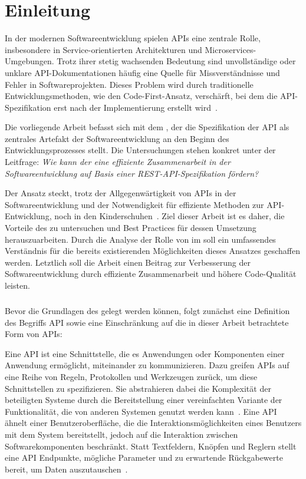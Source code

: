 \chapter{Einleitung}
In der modernen Softwareentwicklung spielen \acp{API} eine zentrale Rolle, insbesondere in Service-orientierten Architekturen und Microservices-Umgebungen.
Trotz ihrer stetig wachsenden Bedeutung sind unvollständige oder unklare \ac{API}-Dokumentationen häufig eine Quelle für Missverständnisse und Fehler in Softwareprojekten.
Dieses Problem wird durch traditionelle Entwicklungsmethoden, wie den Code-First-Ansatz, verschärft, bei dem die \ac{API}-Spezifikation erst nach der Implementierung erstellt wird~\cite[73]{bea22}.

Die vorliegende Arbeit befasst sich mit dem \AFA, der die Spezifikation der \ac{API} als zentrales Artefakt der Softwareentwicklung an den Beginn des Entwicklungsprozesses stellt.
Die Untersuchungen stehen konkret unter der Leitfrage: \emph{Wie kann der \AFA eine effiziente Zusammenarbeit in der Softwareentwicklung auf Basis einer \acs{REST}-\acs{API}-Spezifikation fördern?}

Der Ansatz steckt, trotz der Allgegenwärtigkeit von \acp{API} in der Softwareentwicklung und der Notwendigkeit für effiziente Methoden zur \ac{API}-Entwicklung, noch in den Kinderschuhen~\cite[78]{bea22}.
Ziel dieser Arbeit ist es daher, die Vorteile des \AFAes zu untersuchen und Best Practices für dessen Umsetzung herauszuarbeiten.
Durch die Analyse der Rolle von \OA im \AFA soll ein umfassendes Verständnis für die bereits existierenden Möglichkeiten dieses Ansatzes geschaffen werden.
Letztlich soll die Arbeit einen Beitrag zur Verbesserung der Softwareentwicklung durch effiziente Zusammenarbeit und höhere Code-Qualität leisten.

\paragraph{}
Bevor die Grundlagen des \AFAes gelegt werden können, folgt zunächst eine Definition des Begriffs \acf{API} sowie eine Einschränkung auf die in dieser Arbeit betrachtete Form von \acp{API}:

Eine \ac{API} ist eine Schnittstelle, die es Anwendungen oder Komponenten einer Anwendung ermöglicht, miteinander zu kommunizieren.
Dazu greifen \acp{API} auf eine Reihe von Regeln, Protokollen und Werkzeugen zurück, um diese Schnittstellen zu spezifizieren.
Sie abstrahieren dabei die Komplexität der beteiligten Systeme durch die Bereitstellung einer vereinfachten Variante der Funktionalität, die von anderen Systemen genutzt werden kann~\cite[1]{kul23}.
Eine \ac{API} ähnelt einer Benutzeroberfläche, die die Interaktionsmöglichkeiten eines Benutzers mit dem System bereitstellt, jedoch auf die Interaktion zwischen Softwarekomponenten beschränkt.
Statt Textfeldern, Knöpfen und Reglern stellt eine \ac{API} Endpunkte, mögliche Parameter und zu erwartende Rückgabewerte bereit, um Daten auszutauschen~\cites[351]{de23}{ope23a}.

